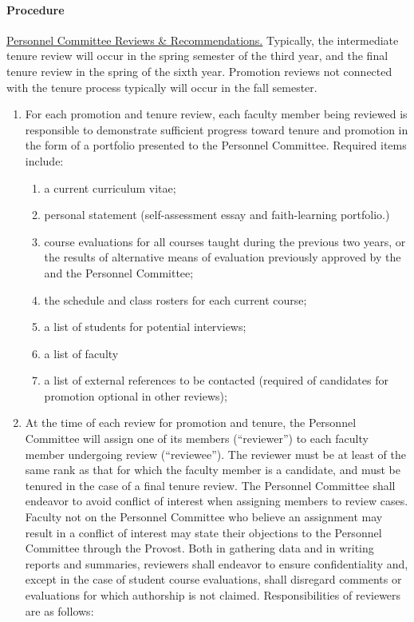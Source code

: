 			\paragraph{Procedure}
				\label{sec:PromotionEvaluationProcedure}
				\underline{Personnel Committee Reviews \& Recommendations.}  Typically, the intermediate tenure review will occur in the spring semester of the third year, and the final tenure review in the spring of the sixth year.  Promotion reviews not connected with the tenure process typically will occur in the fall semester.
				\begin{enumerate}[label=\alph*)]
					\item{For each promotion and tenure review, each faculty member being reviewed is responsible to demonstrate sufficient progress toward tenure and promotion in the form of a portfolio presented to the Personnel Committee.
						Required items include:
						\begin{enumerate}[label=\arabic*)]
							\item{a current curriculum vitae;}
							\item{personal statement (self-assessment essay and faith-learning portfolio.)}
							\item{course evaluations for all courses taught during the previous two years, or the results of alternative means of evaluation previously approved by the and the Personnel Committee;}
							\item{the schedule and class rosters for each current course;}
							\item{a list of students for potential interviews;}
							\item{a list of faculty }
							\item{a list of external references to be contacted (required of candidates for promotion  optional in other reviews);}
						\end{enumerate}
					}
					\item{At the time of each review for promotion and tenure, the Personnel Committee will assign one of its members (``reviewer'') to each faculty member undergoing review (``reviewee'').  The reviewer must be at least of the same rank as that for which the faculty member is a candidate, and must be tenured in the case of a final tenure review.  The Personnel Committee shall endeavor to avoid conflict of interest when assigning members to review cases.  Faculty not on the Personnel Committee who believe an assignment may result in a conflict of interest may state their objections to the Personnel Committee through the Provost.  Both in gathering data and in writing reports and summaries, reviewers shall endeavor to ensure confidentiality and, except in the case of student course evaluations, shall disregard comments or evaluations for which authorship is not claimed.  Responsibilities of reviewers are as follows:
}
\end{enumerate}
